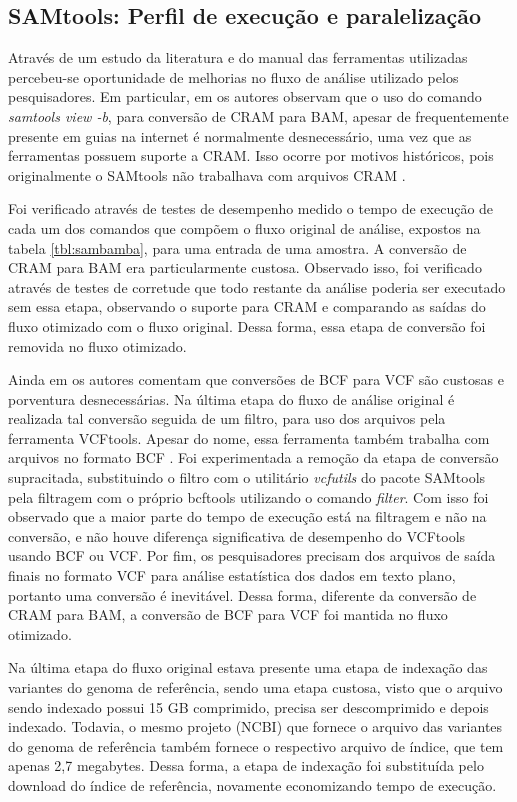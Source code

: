 \documentclass[cic,tc]{iiufrgs}
\begin{document}
\subsection{SAMtools: Perfil de execução e paralelização}

Através de um estudo da literatura e do manual das ferramentas utilizadas
percebeu-se oportunidade de melhorias no fluxo de análise utilizado pelos
pesquisadores. Em particular, em \cite{danecek2021twelve} os autores observam
que o uso do comando \textit{samtools view -b}, para conversão de CRAM para
BAM, apesar de frequentemente presente em guias na internet é normalmente
desnecessário, uma vez que as ferramentas possuem suporte a CRAM. Isso ocorre
por motivos históricos, pois originalmente o SAMtools não trabalhava com
arquivos CRAM \cite{danecek2021twelve}.

Foi verificado através de testes de desempenho medido o tempo de execução de
cada um dos comandos que compõem o fluxo original de análise, expostos na
tabela \ref{tbl:sambamba}, para uma entrada de uma amostra. A conversão de CRAM
para BAM era particularmente custosa.  Observado isso, foi verificado através
de testes de corretude que todo restante da análise poderia ser executado sem
essa etapa, observando o suporte para CRAM e comparando as saídas do fluxo
otimizado com o fluxo original. Dessa forma, essa etapa de conversão foi
removida no fluxo otimizado.

Ainda em \cite{danecek2021twelve} os autores comentam que conversões de BCF
para VCF são custosas e porventura desnecessárias. Na última etapa do fluxo de
análise original é realizada tal conversão seguida de um filtro, para uso dos
arquivos pela ferramenta VCFtools. Apesar do nome, essa ferramenta também
trabalha com arquivos no formato BCF \cite{man2015vcftools}. Foi experimentada a
remoção da etapa de conversão supracitada, substituindo o filtro com o
utilitário \textit{vcfutils} do pacote SAMtools pela filtragem com o próprio
bcftools utilizando o comando \textit{filter}. Com isso foi observado que a
maior parte do tempo de execução está na filtragem e não na conversão, e não
houve diferença significativa de desempenho do VCFtools usando BCF ou VCF. Por
fim, os pesquisadores precisam dos arquivos de saída finais no formato VCF para
análise estatística dos dados em texto plano, portanto uma conversão é
inevitável. Dessa forma, diferente da conversão de CRAM para BAM, a conversão
de BCF para VCF foi mantida no fluxo otimizado.

Na última etapa do fluxo original estava presente uma etapa de indexação das
variantes do genoma de referência, sendo uma etapa custosa, visto que o arquivo
sendo indexado possui 15 GB comprimido, precisa ser descomprimido e depois
indexado. Todavia, o mesmo projeto (NCBI) que fornece o arquivo das variantes
do genoma de referência também fornece o respectivo arquivo de índice, que tem
apenas 2,7 megabytes. Dessa forma, a etapa de indexação foi substituída pelo
download do índice de referência, novamente economizando tempo de execução.
\end{document}
